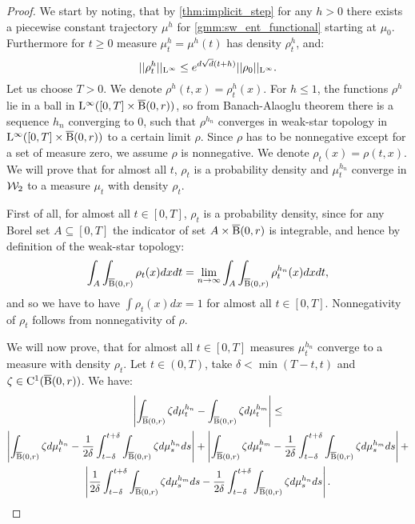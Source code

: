 \begin{proof}
We start by noting, that by \ref{thm:implicit_step} for any $h > 0$ there exists a piecewise constant trajectory $\mu^h$ for \ref{gmm:sw_ent_functional} starting at $\mu_0$. Furthermore for $t \geq 0$ measure $\mu_t^h = \mu^h(t)$ has density $\rho_t^h$, and:
\begin{equation} \label{ineq:dens_bound}
||\rho_t^h||_{\mathrm{L}^{\infty}} \leq e^{d \sqrt{d} (t+ h)} ||\rho_0||_{\mathrm{L}^{\infty}}.
\end{equation}
Let us choose $T > 0$. We denote $\rho^h(t,x) = \rho_t^h(x)$. 
For $ h \leq 1$, the functions $\rho^h$ lie in a ball in $\mathrm{L}^{\infty}([0,T] \times \operatorname{\overline{B}}(0,r))$, so from Banach-Alaoglu theorem there is a sequence $h_n$ converging to $0$, such that $\rho^{h_n}$ converges in weak-star topology in $\mathrm{L}^{\infty}([0,T] \times \operatorname{\overline{B}}(0,r))$ to a certain limit $\rho$. Since $\rho$ has to be nonnegative except for a set of measure zero, we assume $\rho$ is nonnegative. We denote $\rho_t(x) = \rho(t,x)$. We will prove that for almost all $t$, $\rho_t$ is a probability density and $\mu_{t}^{h_n}$ converge in ${\cal W}_2$ to a measure $\mu_t$ with density $\rho_t$.

First of all, for almost all $t \in [0,T]$, $\rho_t$ is a probability density, since for any Borel set $A \subseteq [0,T]$ the indicator of set $A \times \operatorname{\overline{B}}(0,r)$ is integrable, and hence by definition of the weak-star topology:
\[
\int_A \int_{\operatorname{\overline{B}}(0,r)} \rho_t(x) dx dt = \lim_{n \rightarrow \infty} \int_A \int_{\operatorname{\overline{B}}(0,r)} \rho_t^{h_n}(x) dx dt,
\]
and so we have to have $\int \rho_t(x) dx = 1$ for almost all $t \in [0,T]$. Nonnegativity of $\rho_t$ follows from nonnegativity of $\rho$. 

We will now prove, that for almost all $t \in [0,T]$  measures $\mu_t^{h_n}$ converge to a measure with density $\rho_t$. Let $t \in (0,T)$, take $\delta < \min(T-t, t)$ and $\zeta \in \mathrm{C}^1(\operatorname{\overline{B}}(0,r))$. We have:
\begin{multline} \label{ineq:mu_t_conv_bound}
\left| \int_{\operatorname{\overline{B}}(0,r)} \zeta d\mu_t^{h_n} - \int_{\operatorname{\overline{B}}(0,r)} \zeta d\mu_t^{h_m} \right| \leq \\ \left| \int_{\operatorname{\overline{B}}(0,r)} \zeta d\mu_t^{h_n} - \frac{1}{2\delta} \int_{t - \delta}^{t + \delta} \int_{\operatorname{\overline{B}}(0,r)} \zeta d\mu_s^{h_n} ds \right| + 
\left| \int_{\operatorname{\overline{B}}(0,r)} \zeta d\mu_t^{h_m} - \frac{1}{2\delta} \int_{t - \delta}^{t + \delta} \int_{\operatorname{\overline{B}}(0,r)} \zeta d\mu_s^{h_m} ds \right| +  \\
\left| \frac{1}{2\delta} \int_{t - \delta}^{t + \delta} \int_{\operatorname{\overline{B}}(0,r)} \zeta d\mu_s^{h_m} ds - \frac{1}{2\delta} \int_{t - \delta}^{t + \delta} \int_{\operatorname{\overline{B}}(0,r)} \zeta d\mu_s^{h_n} ds \right|.
\end{multline}


\end{proof}
